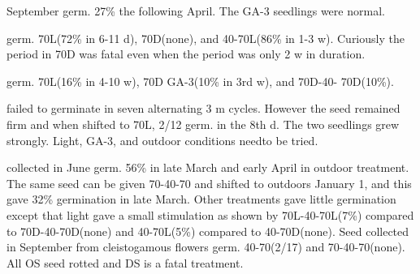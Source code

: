 \begin{description}
September germ. 27\% the following April. The GA-3 seedlings were normal.
\item[V. incisa] germ. 70L(72\% in 6-11 d), 70D(none), and 40-70L(86\% in 1-3 w).
Curiously the period in 70D was fatal even when the period was only 2 w in duration.
\item[V. labradorica] germ. 70L(16\% in 4-10 w), 70D GA-3(10\% in 3rd w), and 70D-40-
70D(10\%).
\item[V. montana] failed to germinate in seven alternating 3 m cycles. However the
seed remained firm and when shifted to 70L, 2/12 germ. in the 8th d. The two
seedlings grew strongly. Light, GA-3, and outdoor conditions needto be tried.
\item[V. palmata] collected in June germ. 56\% in late March and early April in outdoor
treatment. The same seed can be given 70-40-70 and shifted to outdoors January 1,
and this gave 32\% germination in late March. Other treatments gave little germination
except that light gave a small stimulation as shown by 70L-40-70L(7\%) compared to
70D-40-70D(none) and 40-70L(5\%) compared to 40-70D(none). Seed collected in
September from cleistogamous flowers germ. 40-70(2/17) and 70-40-70(none). All
OS seed rotted and DS is a fatal treatment.


\end{description}
